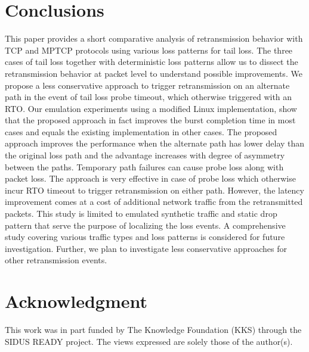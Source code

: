 \documentclass[10pt,conference]{IEEEtran}
\begin{document}
\section{Conclusions}\label{conc}
This paper provides a short comparative analysis of retransmission behavior with TCP and MPTCP protocols using various loss patterns for tail loss.
The three cases of tail loss together with deterministic loss patterns allow us to dissect the retransmission behavior at packet level to 
understand possible improvements.
We propose a less conservative approach to trigger retransmission on an alternate path in the event of tail loss probe timeout, which otherwise 
triggered with an RTO. Our emulation experiments  using a modified Linux implementation, show that the proposed approach in fact improves the 
burst completion time in most cases and equals the existing implementation in other cases. The proposed approach improves the performance when 
the alternate path has lower delay than the original loss path and the advantage increases with degree of asymmetry between the paths. 
Temporary path failures can cause probe loss along with packet loss. The approach is very effective in case of probe loss which otherwise 
incur RTO timeout to trigger retransmission on either path. However, the latency improvement comes at a cost of additional network traffic 
from the retransmitted packets. This study is limited to emulated synthetic traffic and static drop pattern that serve the purpose of localizing 
the loss events. A comprehensive study covering various traffic types and loss patterns is considered for future investigation. Further, we plan 
to investigate less conservative approaches for other retransmission events.

\section*{Acknowledgment}
This work was in part funded by The Knowledge Foundation (KKS) through the SIDUS READY project. The views expressed are solely those of the 
author(s).

\balance



\end{document}
